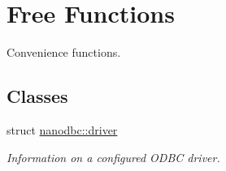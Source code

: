 \hypertarget{group__mainf}{}\section{Free Functions}
\label{group__mainf}


Convenience functions.  


\subsection*{Classes}
\begin{DoxyCompactItemize}
\item 
struct \mbox{\hyperlink{structnanodbc_1_1driver}{nanodbc\+::driver}}
\begin{DoxyCompactList}\small\item\em Information on a configured O\+D\+BC driver. \end{DoxyCompactList}\end{DoxyCompactItemize}
